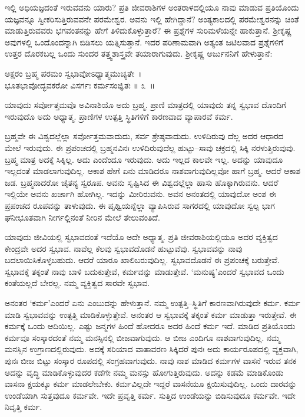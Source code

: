 ಇಲ್ಲಿ ಅಧಿಯಜ್ಞದಂತೆ ಇರುವವನು ಯಾರು? ಪ್ರತಿ ಜೀವರಾಶಿಗಳ ಅಂತರಾಳದಲ್ಲಿಯೂ ನಾವು ಮಾಡುವ ಪ್ರತಿಯೊಂದು ಯಜ್ಞವನ್ನೂ ಸ್ವೀಕರಿಸುತ್ತಿರುವವನೇ ಪರಮೇಶ್ವರ. ಅವನು ಇಲ್ಲಿ ಹೇಗಿದ್ದಾನೆ? ಅಂತ್ಯಕಾಲದಲ್ಲಿ ಪರಮೇಶ್ವರನನ್ನು ಚಿಂತೆ ಮಾಡುತ್ತಿರುವವರು ಭಗವಂತನನ್ನು ಹೇಗೆ ತಿಳಿದುಕೊಳ್ಳುತ್ತಾರೆ? ಈ ಪ್ರಶ್ನೆಗಳ ಸುರಿಮಳೆಯನ್ನೇ ಹಾಕುತ್ತಾನೆ. ಶ‍್ರೀಕೃಷ್ಣ ಅವುಗಳಲ್ಲಿ ಒಂದೊಂದನ್ನಾಗಿ ಬಿಡಿಸಲು ಯತ್ನಿಸುತ್ತಾನೆ. ಇದರ ಪರಿಣಾಮವಾಗಿ ಅತ್ಯಂತ ಜಟಿಲವಾದ ಪ್ರಶ್ನೆಗಳಿಗೆ ಉತ್ತರ ದೊರಕಬಲ್ಲ ಒಂದು ಸುಂದರ ತತ್ತ್ವಶಾಸ್ತ್ರವೇ ತಯಾರಾಗುವುದು. ಶ‍್ರೀಕೃಷ್ಣ ಅರ್ಜುನನಿಗೆ ಹೇಳುತ್ತಾನೆ:

\begin{shloka}
ಅಕ್ಷರಂ ಬ್ರಹ್ಮ ಪರಮಂ ಸ್ವಭಾವೋಽಧ್ಯಾತ್ಮಮುಚ್ಯತೇ~।\\ಭೂತಭಾವೋದ್ಭವಕರೋ ವಿಸರ್ಗಃ ಕರ್ಮಸಂಜ್ಞಿತಃ \hfill॥ ೩~॥
\end{shloka}

\begin{artha}
ಯಾವುದು ಸರ್ವೋತ್ತಮವೊ ಅವಿನಾಶಿಯೊ ಅದು ಬ್ರಹ್ಮ. ಪ್ರಾಣಿ ಮಾತ್ರದಲ್ಲಿ ಯಾವುದು ತನ್ನ ಸ್ವಭಾವ ದೊಂದಿಗೆ ಇರುವುದೊ ಅದು ಅಧ್ಯಾತ್ಮ. ಪ್ರಾಣಿಗಳ ಉತ್ಪತ್ತಿ ಸ್ಥಿತಿಗಳಿಗೆ ಕಾರಣವಾದ ವ್ಯಾಪಾರವೆ ಕರ್ಮ.
\end{artha}

ಬ್ರಹ್ಮವೇ ಈ ವಿಶ್ವದಲ್ಲೆಲ್ಲಾ ಸರ್ವೋತ್ತಮವಾದುದು, ಸರ್ವ ಶ್ರೇಷ್ಠವಾದುದು. ಉಳಿದಿರುವು ದೆಲ್ಲ ಅದರ ಆಧಾರದ ಮೇಲೆ ಇರುವುದು. ಈ ಪ್ರಪಂಚದಲ್ಲಿ ಬ್ರಹ್ಮನವಿನಃ ಉಳಿದಿರುವುದೆಲ್ಲ ಹುಟ್ಟು–ಸಾವು ಚಕ್ರದಲ್ಲಿ ಸಿಕ್ಕಿ ನರಳುತ್ತಿರುವುವು. ಬ್ರಹ್ಮ ಮಾತ್ರ ಅದಕ್ಕೆ ಸಿಕ್ಕಿಲ್ಲ. ಅದು ಎಂದೆಂದೂ ಇರುವುದು. ಅದು ಇಲ್ಲದ ಕಾಲವೇ ಇಲ್ಲ. ಅದನ್ನು ಯಾವುದೂ ಇಲ್ಲದಂತೆ ಮಾಡಲಾಗುವುದಿಲ್ಲ. ಆಕಾಶ ಹೇಗೆ ಏನು ಮಾಡಿದರೂ ನಾಶವಾಗುವುದಿಲ್ಲವೋ ಹಾಗೆ ಬ್ರಹ್ಮ. ಆದರೆ ಆಕಾಶ ಜಡ. ಬ್ರಹ್ಮನಾದರೋ ಚೈತನ್ಯ ಸ್ವರೂಪ. ಅವನು ಸೃಷ್ಟಿಸಿದ ಈ ವಿಶ್ವದಲ್ಲೆಲ್ಲಾ ಹಾಸು ಹೊಕ್ಕಾಗಿರುವನು. ಆದರೆ ಇಲ್ಲಿಯೇ ಅವನು ಖರ್ಚಾಗಿ ಹೋಗಿಲ್ಲ. ಇದನ್ನು ಮೀರಿರುವನು. ಅವನ ಅನಂತದಲ್ಲಿ ಯಾವುದೋ ಅಂಶ ಈ ಪ್ರಪಂಚದ ರೂಪವನ್ನು ತಾಳುವುದು. ಈ ಪೃಥ್ವಿಯನ್ನೆಲ್ಲಾ ವ್ಯಾಪಿಸಿರುವ ಸಾಗರದಲ್ಲಿ ಯಾವುದೋ ಸ್ವಲ್ಪ ಭಾಗ ಘನೀಭೂತವಾಗಿ ನೀರ್ಗಲ್ಲಿನಂತೆ ನೀರಿನ ಮೇಲೆ ತೇಲುವಂತಿದೆ.

ಯಾವುದು ಜೀವಿಯಲ್ಲಿ ಸ್ವಭಾವದಂತೆ ಇದೆಯೊ ಅದೇ ಅಧ್ಯಾತ್ಮ. ಪ್ರತಿ ಜೀವರಾಶಿ\-ಯಲ್ಲಿಯೂ ಅದರ ವ್ಯಕ್ತಿತ್ವದ ಕೇಂದ್ರವೇ ಅದರ ಸ್ವಭಾವ. ನಾವೆಲ್ಲ ಕೆಲವು ಸ್ವಭಾವದೊಡನೆ ಹುಟ್ಟುವೆವು. ಸ್ವಭಾವವನ್ನು ನಾವು ಬದಲಾಯಿಸಿಕೊಳ್ಳಬಹುದು. ಆದರೆ ಯಾರೂ ಖಾಲಿ\break ಬರುವುದಿಲ್ಲ. ಸ್ವಭಾವದೊಡನೆ ಈ ಪ್ರಪಂಚಕ್ಕೆ ಬರುತ್ತೇವೆ. ಸ್ವಭಾವಕ್ಕೆ ತಕ್ಕಂತೆ ನಾವು ಬಾಳಿ ಬದುಕುತ್ತೇವೆ, ಕರ್ಮವನ್ನು ಮಾಡುತ್ತೇವೆ. ‘ಮನುಷ್ಯ’ಎಂದರೆ ಸ್ವಭಾವದ ಒಂದು ಕಂತೆಯಲ್ಲದೆ ಬೇರಲ್ಲ. ನಮ್ಮ ವ್ಯಕ್ತಿತ್ವದ ಸಾರವೇ ಸ್ವಭಾವ.

ಅನಂತರ ‘ಕರ್ಮ’ಎಂದರೆ ಏನು ಎಂಬುದನ್ನು ಹೇಳುತ್ತಾನೆ. ನಮ್ಮ ಉತ್ಪತ್ತಿ–ಸ್ಥಿತಿಗೆ ಕಾರಣ\-ವಾಗಿರುವುದೇ ಕರ್ಮ. ಕರ್ಮ ಮಾಡಿ ಸ್ವಭಾವವನ್ನು ಉತ್ಪತ್ತಿ ಮಾಡಿಕೊಳ್ಳುತ್ತೇವೆ. ಅನಂತರ ಆ ಸ್ವಭಾವಕ್ಕೆ ತಕ್ಕಂತೆ ಕರ್ಮ ಮಾಡುತ್ತಾ ಇರುತ್ತೇವೆ. ಈ ಕರ್ಮಕ್ಕೆ ಒಂದು ಆದಿಯಿಲ್ಲ. ಎಷ್ಟು ಜನ್ಮಗಳ ಹಿಂದೆ ಹೋದರೂ ಅದರ ಹಿಂದೆ ಕರ್ಮ ಇದೆ. ಮಾಡಿದ ಪ್ರತಿಯೊಂದು ಕರ್ಮವೂ ಸಂಸ್ಕಾರದಂತೆ ನಮ್ಮ ಮನಸ್ಸಿನಲ್ಲಿ ಬೀಜವಾಗುವುದು. ಆ ಬೀಜ ಎಂದಿಗೂ ನಾಶವಾಗುವುದಿಲ್ಲ. ನಮ್ಮ ಮನಸ್ಸಿನ ಉಗ್ರಾಣದಲ್ಲಿರುವುದು. ಅದಕ್ಕೆ ಸರಿಯಾದ ವಾತಾವರಣ ಸಿಕ್ಕಿದರೆ ಪುನಃ ಅದು ಕಾರ್ಯರೂಪದಲ್ಲಿ ವ್ಯಕ್ತವಾಗಿ, ಪುನಃ ಬೀಜ ಬಿಟ್ಟು ಸಂಸ್ಕಾರ ರೂಪದಲ್ಲಿ ಸಂಗ್ರಹವಾಗುವುದು. ನಾವು ನಾಶ ಮಾಡಿದ ಕರ್ಮಗಳ ವಾಸನೆ ಇರುವ ತನಕ ಅದನ್ನು ವೃದ್ಧಿ ಮಾಡಿಕೊಳ್ಳುವುದರ ಕಡೆಗೇ ನಮ್ಮ ಮನಸ್ಸು ಹೋಗುತ್ತಿರುವುದು. ಅದನ್ನು ಕಡಮೆ ಮಾಡಿಕೊಂಡು ವಾಸನಾ ಕ್ಷಯಕ್ಕೂ ಕರ್ಮ ಮಾಡಲೇಬೇಕು. ಕರ್ಮವಿಲ್ಲದೇ ಇದ್ದರೆ ವಾಸನೆಯೂ ಕ್ಷಯಿಸುವುದಿಲ್ಲ. ಒಂದು ದಾರವನ್ನು ಉಂಡೆಯಾಗಿ ಸುತ್ತವುದೂ ಕರ್ಮವೇ. ಇದೇ ಪ್ರವೃತ್ತಿ ಕರ್ಮ. ಸುತ್ತಿದ ಉಂಡೆಯನ್ನು ಬಿಡಿಸುವುದೂ ಕರ್ಮವೇ. ಇದೇ ನಿವೃತ್ತಿ ಕರ್ಮ.

